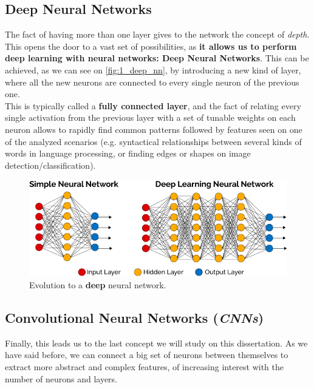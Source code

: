 \subsection{Deep Neural Networks}
The fact of having more than one layer gives to the network the concept of \emph{depth}. This opens the door to a vast set of possibilities, as \textbf{it allows us to perform deep learning with neural networks: Deep Neural Networks}. This can be achieved, as we can see on \autoref{fig:1_deep_nn}, by introducing a new kind of layer, where all the new neurons are connected to every single neuron of the previous one.\\
This is typically called a \textbf{fully connected layer}, and the fact of relating every single activation from the previous layer with a set of tunable weights on each neuron allows to rapidly find common patterns followed by features seen on one of the analyzed scenarios (e.g. syntactical relationships between several kinds of words in language processing, or finding edges or shapes on image detection/classification).

\begin{figure}[h]
	\centering
	\includegraphics[width=0.9\linewidth]{images/deep_neural_network}
	\caption{Evolution to a \textbf{deep} neural network.}
	\label{fig:1_deep_nn}
\end{figure}

\subsection{Convolutional Neural Networks (\emph{CNNs})}
\label{sec:1_cnn}

Finally, this leads us to the last concept we will study on this dissertation. As we have said before, we can connect a big set of neurons between themselves to extract more abstract and complex features, of increasing interest with the number of neurons and layers.\\
 
